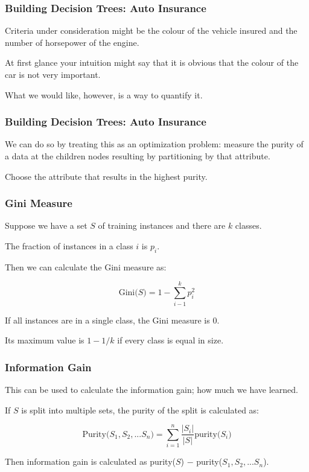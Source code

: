 \begin{frame}
\frametitle{Building Decision Trees: Auto Insurance}

Criteria under consideration might be the colour of the vehicle insured and the number of horsepower of the engine. 

At first glance your intuition might say that it is obvious that the colour of the car is not very important.

What we would like, however, is a way to quantify it.

\end{frame}

\begin{frame}
\frametitle{Building Decision Trees: Auto Insurance}

We can do so by treating this as an optimization problem: measure the purity of a data at the children nodes resulting by partitioning by that attribute. 

Choose the attribute that results in the highest purity.

\end{frame}

\begin{frame}
\frametitle{Gini Measure}

Suppose we have a set $S$ of training instances and there are $k$ classes. 

The fraction of instances in a class $i$ is $p_{i}$. 

Then we can calculate the Gini measure as:


$$\mbox{Gini($S$)} = 1 - \sum_{i-1}^{k}p_{i}^{2}$$

If all instances are in a single class, the Gini measure is 0.

Its maximum value is $1-1/k$ if every class is equal in size.

\end{frame}

\begin{frame}
\frametitle{Information Gain}

This can be used to calculate the information gain; how much we have learned. 

If $S$ is split into multiple sets, the purity of the split is calculated as:

$$\mbox{Purity($S_{1}, S_{2}, ... S_{n}$)} = \sum_{i = 1}^{n}\dfrac{|S_{i}|}{|S|} \mbox{purity($S_{i}$)}$$

Then information gain is calculated as purity($S$) $-$ purity($S_{1}, S_{2}, ... S_{n}$).

\end{frame}

